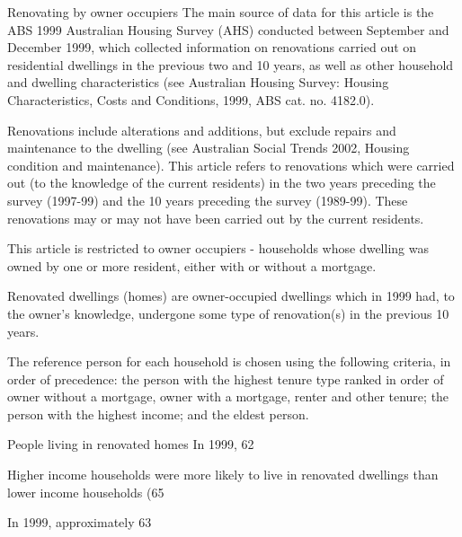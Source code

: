 Renovating by owner occupiers
The main source of data for this article is the ABS 1999 Australian Housing Survey (AHS) conducted between September and December 1999, which collected information on renovations carried out on residential dwellings in the previous two and 10 years, as well as other household and dwelling characteristics (see Australian Housing Survey: Housing Characteristics, Costs and Conditions, 1999, ABS cat. no. 4182.0). 

Renovations include alterations and additions, but exclude repairs and maintenance to the dwelling (see Australian Social Trends 2002, Housing condition and maintenance). This article refers to renovations which were carried out (to the knowledge of the current residents) in the two years preceding the survey (1997-99) and the 10 years preceding the survey (1989-99). These renovations may or may not have been carried out by the current residents.

This article is restricted to owner occupiers - households whose dwelling was owned by one or more resident, either with or without a mortgage.

Renovated dwellings (homes) are owner-occupied dwellings which in 1999 had, to the owner’s knowledge, undergone some type of renovation(s) in the previous 10 years.

The reference person for each household is chosen using the following criteria, in order of precedence:
the person with the highest tenure type ranked in order of owner without a mortgage, owner with a mortgage, renter and other tenure;
the person with the highest income; and
the eldest person.


People living in renovated homes
In 1999, 62%

Higher income households were more likely to live in renovated dwellings than lower income households (65%

In 1999, approximately 63%



